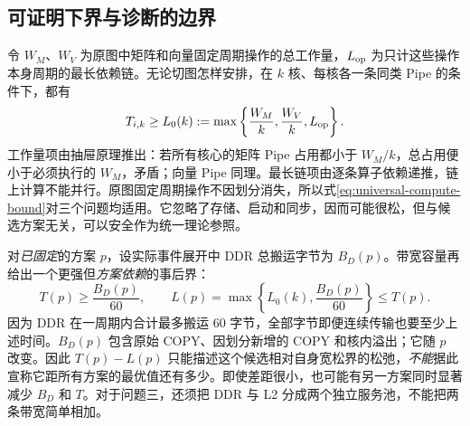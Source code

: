 \subsection{可证明下界与诊断的边界}
令 $W_M$、$W_V$ 为原图中矩阵和向量固定周期操作的总工作量，$L_{\rm op}$ 为只计这些操作本身周期的最长依赖链。无论切图怎样安排，在 $k$ 核、每核各一条同类 Pipe 的条件下，都有
\begin{equation}\label{eq:universal-compute-bound}
T_{i,k}\ge L_0(k):=
\max\left\{\frac{W_M}{k},\frac{W_V}{k},L_{\rm op}\right\}.
\end{equation}
工作量项由抽屉原理推出：若所有核心的矩阵 Pipe 占用都小于 $W_M/k$，总占用便小于必须执行的 $W_M$，矛盾；向量 Pipe 同理。最长链项由逐条算子依赖递推，链上计算不能并行。原图固定周期操作不因划分消失，所以式\eqref{eq:universal-compute-bound}对三个问题均适用。它忽略了存储、启动和同步，因而可能很松，但与候选方案无关，可以安全作为统一理论参照。

对\emph{已固定}的方案 $p$，设实际事件展开中 DDR 总搬运字节为 $B_D(p)$。带宽容量再给出一个更强但\emph{方案依赖}的事后界：
\begin{equation}\label{eq:conditional-bandwidth-bound}
T(p)\ge \frac{B_D(p)}{60},
\qquad
L(p)=\max\left\{L_0(k),\frac{B_D(p)}{60}\right\}\le T(p).
\end{equation}
因为 DDR 在一周期内合计最多搬运 $60$ 字节，全部字节即便连续传输也要至少上述时间。$B_D(p)$ 包含原始 COPY、因划分新增的 COPY 和核内溢出；它随 $p$ 改变。因此 $T(p)-L(p)$ 只能描述这个候选相对自身宽松界的松弛，\emph{不能}据此宣称它距所有方案的最优值还有多少。即使差距很小，也可能有另一方案同时显著减少 $B_D$ 和 $T$。对于问题三，还须把 DDR 与 L2 分成两个独立服务池，不能把两条带宽简单相加。

